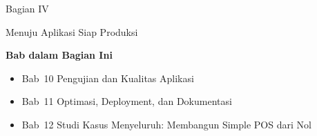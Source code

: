 \documentclass[
    paper=23cm:15.5cm,   %
    11pt,               %
    twoside,            %
    openany,            %
    bibliography=totoc, %
]{scrbook}            %
\begin{document}






\newpage
{}
\vspace*{4cm}
{\fontsize{28}{34}\sffamily\bfseries\raggedright Bagian IV\par}
\vspace{6pt}
{\fontsize{22}{28}\sffamily\bfseries\raggedright Menuju Aplikasi Siap Produksi\par}
\vspace{16pt}
{\large\sffamily\bfseries Bab dalam Bagian Ini}\par
\vspace{6pt}
\begin{itemize}[topsep=0pt, itemsep=2pt]
  \item Bab~10 \textbullet{} Pengujian dan Kualitas Aplikasi
  \item Bab~11 \textbullet{} Optimasi, Deployment, dan Dokumentasi
  \item Bab~12 \textbullet{} Studi Kasus Menyeluruh: Membangun Simple POS dari Nol
\end{itemize}
\newpage







\appendix











\backmatter

\nocite{*}

\printbibliography[heading=bibintoc, title={Daftar Pustaka}]

\printindex
\end{document}
